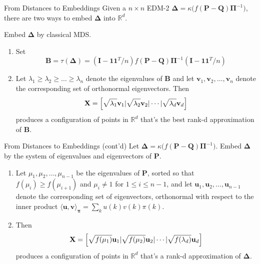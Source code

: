 \documentclass[professionalfonts,hyperref={pdfpagelabels=false,colorlinks=true,linkcolor=red}]{beamer}
\begin{document}
\begin{frame}{From Distances to Embeddings}
  Given a $n \times n$ EDM-2 $\bm{\Delta} = \kappa\bigl(f(\mathbf{P} -
  \mathbf{Q})\bm{\Pi}^{-1}\bigr)$, there are two ways to embed
  $\bm{\Delta}$ into $\mathbb{R}^{d}$. 
  
  \vskip10pt Embed $\bm{\Delta}$ by classical MDS.  
  \begin{enumerate}
  \item Set 
    \begin{equation*}
      \mathbf{B} = \tau(\bm{\Delta}) = (\mathbf{I} -
      \bm{1}\bm{1}^{T}/n) f(\mathbf{P} - \mathbf{Q})\bm{\Pi}^{-1} (\mathbf{I} -
      \bm{1}\bm{1}^{T}/n)
    \end{equation*}
  \item Let $\lambda_1 \geq \lambda_2 \geq \dots \geq \lambda_n$
    denote the eigenvalues of $\mathbf{B}$ and let $\bm{v}_1,
    \bm{v}_2, \dots, \bm{v}_n$ denote the corresponding set of
    orthonormal eigenvectors. Then
    \begin{equation*}
      \mathbf{X} = \Bigl[ \sqrt{\lambda_1} \mathbf{v}_1 |
      \sqrt{\lambda_2} \mathbf{v}_{2} | \cdots |
      \sqrt{\lambda_d} \mathbf{v}_d \Bigr]
    \end{equation*}
    produces a configuration of points in $\mathbb{R}^{d}$ that's
    the \alert{best rank-d approximation} of $\mathbf{B}$. 
  \end{enumerate}
\end{frame}
    
\begin{frame}{From Distances to Embeddings (cont'd)}
  Let $\bm{\Delta} = \kappa\bigl(f(\mathbf{P} -
  \mathbf{Q})\bm{\Pi}^{-1}\bigr)$. Embed $\bm{\Delta}$ by the system
  of eigenvalues and eigenvectors of $\mathbf{P}$.
  \begin{enumerate}
  \item Let $\mu_1, \mu_2, \dots, \mu_{n-1}$ be the eigenvalues of
    $\mathbf{P}$, sorted so that $f(\mu_{i}) \geq f(\mu_{i+1})$ and
    $\mu_i \not= 1$ for $1 \leq i \leq n - 1$, and let $\bm{u}_1,
    \bm{u}_2, \dots, \bm{u}_{n-1}$ denote the corresponding set of
    eigenvectors, orthonormal with respect to the inner product
    $\langle
    \bm{u}, \bm{v} \rangle_{\bm{\pi}} = \sum_{k}{u(k) v(k) \pi(k)}$.
  \item Then
    \begin{equation*}
      \mathbf{X} = \Bigl[ \sqrt{f(\mu_1)} \mathbf{u}_1 |
      \sqrt{f(\mu_2)} \mathbf{u}_{2} | \cdots |
      \sqrt{f(\lambda_d)} \mathbf{u}_d \Bigr]
    \end{equation*}
    produces a configuration of points in $\mathbb{R}^{d}$ that's a
    rank-d approximation of $\bm{\Delta}$. 
  \end{enumerate}
\end{frame}
\end{document}
